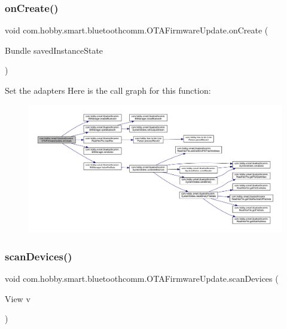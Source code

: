 \subsubsection{\texorpdfstring{on\+Create()}{onCreate()}}
{\footnotesize\ttfamily void com.\+hobby.\+smart.\+bluetoothcomm.\+O\+T\+A\+Firmware\+Update.\+on\+Create (\begin{DoxyParamCaption}\item[{Bundle}]{saved\+Instance\+State }\end{DoxyParamCaption})\hspace{0.3cm}{\ttfamily [protected]}}

Set the adapters Here is the call graph for this function\+:\nopagebreak
\begin{figure}[H]
\begin{center}
\leavevmode
\includegraphics[width=350pt]{classcom_1_1hobby_1_1smart_1_1bluetoothcomm_1_1_o_t_a_firmware_update_ac1da9ccafc28943f6db5e8e5e0685be5_cgraph}
\end{center}
\end{figure}
\mbox{\label{classcom_1_1hobby_1_1smart_1_1bluetoothcomm_1_1_o_t_a_firmware_update_ac20ac5be70b412d1b4afacd39decdf06}} 
\subsubsection{\texorpdfstring{scan\+Devices()}{scanDevices()}}
{\footnotesize\ttfamily void com.\+hobby.\+smart.\+bluetoothcomm.\+O\+T\+A\+Firmware\+Update.\+scan\+Devices (\begin{DoxyParamCaption}\item[{View}]{v }\end{DoxyParamCaption})}

